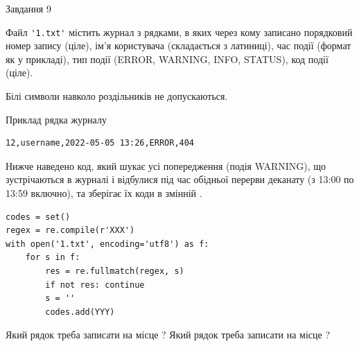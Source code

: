 \documentclass[12pt, ukrainian]{article}
\def\code#1{\Verb!#1!}
\begin{document}
{\begin{minipage}[t]{8.0cm}
\end{minipage}

               
{\begin{center}Завдання {9}\end{center}}
\vspace{-4mm}
Файл \code{'1.txt'} містить журнал з рядками, в яких через кому записано поряд\-ко\-вий номер запису (ціле), ім'я користувача (складається з латиниці), час події (фор\-мат як у прикладі), тип події (ERROR, WARNING, INFO, STATUS), код події (ціле).

Білі символи навколо роздільників не допускаються.

Приклад рядка журналу



\begin{verbatim}
12,username,2022-05-05 13:26,ERROR,404
\end{verbatim}


Нижче наведено код, який шукає усі попередження (подія WARNING), що зустрі\-ча\-ються в журналі і відбулися під час обідньої перерви деканату (з 13:00 по 13:59 включно), та зберігає їх коди в змінній .



\begin{verbatim}
codes = set()
regex = re.compile(r'XXX')
with open('1.txt', encoding='utf8') as f:
    for s in f:
        res = re.fullmatch(regex, s)
        if not res: continue
        s = ''
        codes.add(YYY)
\end{verbatim}





Який рядок треба записати на місце  ?
Який рядок треба записати на місце  ?\par

}
\end{document}
